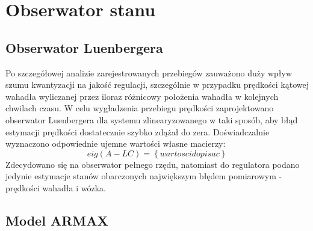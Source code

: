 \section{Obserwator stanu}
\subsection{Obserwator Luenbergera}
Po szczegółowej analizie zarejestrowanych przebiegów zauważono duży wpływ szumu kwantyzacji na jakość regulacji, szczególnie w przypadku prędkości kątowej wahadła wyliczanej przez iloraz różnicowy położenia wahadła w kolejnych chwilach czasu. W celu wygładzenia przebiegu prędkości zaprojektowano obserwator Luenbergera dla systemu zlinearyzowanego w taki sposób, aby błąd estymacji prędkości dostatecznie szybko zdążał do zera. Doświadczalnie wyznaczono odpowiednie ujemne wartości własne macierzy:
\begin{equation}  
eig(A-LC) = \left\lbrace wartosci dopisac \right\rbrace 
\end{equation} 
Zdecydowano się na obserwator pełnego rzędu, natomiast do regulatora podano jedynie estymacje stanów obarczonych największym błędem pomiarowym - prędkości wahadła i wózka.

\subsection{Model ARMAX}
